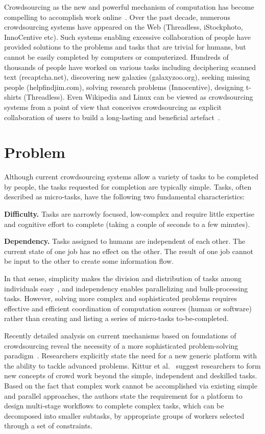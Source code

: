 Crowdsourcing as the new and powerful mechanism of computation has become 
compelling to accomplish work online~\cite{Kittur2011}. Over the past decade, numerous 
crowdsourcing systems have appeared on the Web (Threadless, iStockphoto, 
InnoCentive etc). Such systems enabling excessive collaboration of people have 
provided solutions to the problems and tasks that are trivial for humans, but 
cannot be easily completed by computers or computerized. Hundreds of thousands 
of people have worked on various tasks including deciphering scanned text (recaptcha.net), 
discovering new galaxies (galaxyzoo.org), seeking missing people (helpfindjim.com), 
solving research problems (Innocentive), designing t-shirts (Threadless). Even 
Wikipedia and Linux can be viewed as crowdsourcing systems from a point of view that
conceives crowdsourcing as explicit collaboration of users to 
build a long-lasting and beneficial artefact~\cite{Doan2011}.


\section{Problem}
\label{sec:problem}

Although current crowdsourcing systems allow a variety of tasks 
to be completed by people, the tasks requested for completion are typically simple. 
Tasks, often described as micro-tasks, have the following two fundamental characteristics:

\textbf{Difficulty.} Tasks are narrowly focused, low-complex and require 
little expertise and cognitive effort to complete (taking a couple of seconds to 
a few minutes).

\textbf{Dependency.} Tasks assigned to humans are independent of each other. 
The current state of one job has no effect on the other. The result of one job cannot 
be input to the other to create some information flow.

In that sense, simplicity makes the division and distribution of tasks among 
individuals easy~\cite{Zhang2011}, and independency enables parallelizing 
and bulk-processing tasks. However, solving more complex and sophisticated 
problems requires effective and efficient coordination of computation sources 
(human or software) rather than creating and listing a series of micro-tasks 
to-be-completed.

Recently detailed analysis on current mechanisms based on foundations of 
crowdsourcing reveal the necessity of a more sophisticated problem-solving 
paradigm~\cite{Kittur2013}. Researchers explicitly state the need for a new generic platform 
with the ability to tackle advanced problems. Kittur et al.~\cite{Kittur2013} 
suggest researchers to form new concepts of crowd work beyond 
the simple, independent and deskilled tasks. Based on the fact that complex 
work cannot be accomplished via existing simple and parallel approaches,
the authors state the requirement for a platform to design multi-stage workflows 
to complete complex tasks, which can be decomposed into smaller subtasks, 
by appropriate groups of workers selected through a set of constraints.

